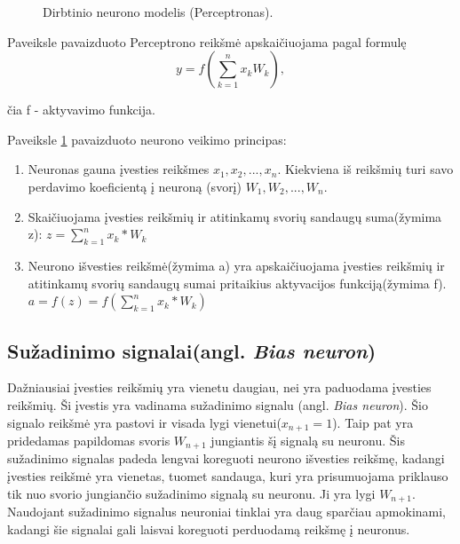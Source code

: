 \begin{figure} \label{fig:perceptron}
  \centering
{}
\caption{Dirbtinio neurono modelis (Perceptronas).}
\end{figure}

Paveiksle pavaizduoto Perceptrono reikšmė apskaičiuojama pagal formulę
\begin{equation*}
  y = f \left(\sum_{k=1}^{n} x_k W_k \right),
\end{equation*}

čia f - aktyvavimo funkcija.

Paveiksle \ref{fig:perceptron} pavaizduoto neurono veikimo principas:
\begin{enumerate}

\item Neuronas gauna įvesties reikšmes $x_1, x_2, ... , x_n$. Kiekviena iš reikšmių turi savo perdavimo koeficientą į neuroną (svorį) $W_1, W_2, ... , W_n$.
\item  Skaičiuojama įvesties reikšmių ir atitinkamų svorių sandaugų suma(žymima z):
  $z = \sum_{k=1}^{n} x_k * W_k$
\item  Neurono išvesties reikšmė(žymima a) yra apskaičiuojama įvesties reikšmių ir atitinkamų svorių sandaugų sumai pritaikius aktyvacijos funkciją(žymima f).
  $a = f(z) = f(\sum_{k=1}^{n} x_k * W_k)$
\end{enumerate}

\subsection{Sužadinimo signalai(angl. \textit{Bias neuron})}
Dažniausiai įvesties reikšmių yra vienetu daugiau, nei yra paduodama įvesties reikšmių. Ši įvestis yra vadinama sužadinimo signalu (angl. \textit{Bias neuron}). Šio signalo reikšmė yra pastovi ir visada lygi vienetui($x_{n+1} = 1$). Taip pat yra pridedamas papildomas svoris $W_{n+1}$ jungiantis šį signalą su neuronu.\cite{Ieva2012}
Šis sužadinimo signalas padeda lengvai koreguoti neurono išvesties reikšmę, kadangi įvesties reikšmė yra vienetas, tuomet sandauga, kuri yra prisumuojama priklauso tik nuo svorio jungiančio sužadinimo signalą su neuronu. Ji yra lygi  $W_{n+1}$. Naudojant sužadinimo signalus neuroniai tinklai yra daug sparčiau apmokinami, kadangi šie signalai gali laisvai koreguoti perduodamą reikšmę į neuronus.
